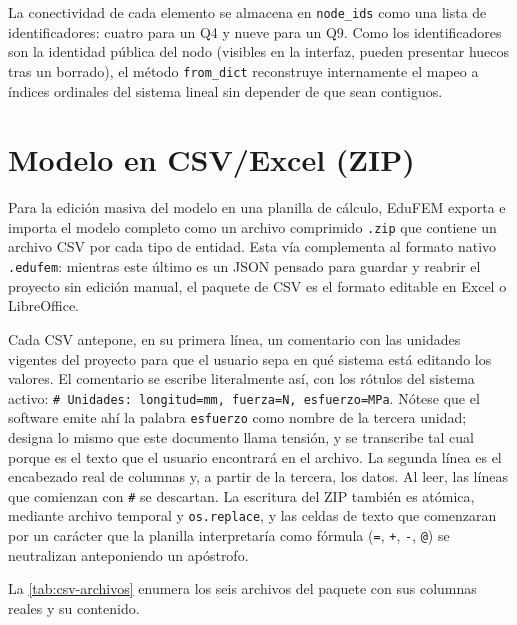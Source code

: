 La conectividad de cada elemento se almacena en \texttt{node\_ids} como una lista de identificadores: cuatro para un Q4 y nueve para un Q9. Como los identificadores son la identidad pública del nodo (visibles en la interfaz, pueden presentar huecos tras un borrado), el método \texttt{from\_dict} reconstruye internamente el mapeo a índices ordinales del sistema lineal sin depender de que sean contiguos.

\section{Modelo en CSV/Excel (ZIP)}

Para la edición masiva del modelo en una planilla de cálculo, EduFEM exporta e importa el modelo completo como un archivo comprimido \texttt{.zip} que contiene un archivo CSV por cada tipo de entidad. Esta vía complementa al formato nativo \texttt{.edufem}: mientras este último es un JSON pensado para guardar y reabrir el proyecto sin edición manual, el paquete de CSV es el formato editable en Excel o LibreOffice.

Cada CSV antepone, en su primera línea, un comentario con las unidades vigentes del proyecto para que el usuario sepa en qué sistema está editando los valores. El comentario se escribe literalmente así, con los rótulos del sistema activo: \texttt{\# Unidades: longitud=mm, fuerza=N, esfuerzo=MPa}. Nótese que el software emite ahí la palabra \texttt{esfuerzo} como nombre de la tercera unidad; designa lo mismo que este documento llama tensión, y se transcribe tal cual porque es el texto que el usuario encontrará en el archivo. La segunda línea es el encabezado real de columnas y, a partir de la tercera, los datos. Al leer, las líneas que comienzan con \texttt{\#} se descartan. La escritura del ZIP también es atómica, mediante archivo temporal y \texttt{os.replace}, y las celdas de texto que comenzaran por un carácter que la planilla interpretaría como fórmula (\texttt{=}, \texttt{+}, \texttt{-}, \texttt{@}) se neutralizan anteponiendo un apóstrofo.

La \autoref{tab:csv-archivos} enumera los seis archivos del paquete con sus columnas reales y su contenido.

